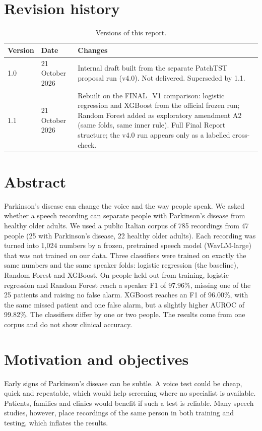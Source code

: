\documentclass[11pt,a4paper]{article}
\begin{document}
\section*{Revision history}
\begin{table}[H]\centering\small\renewcommand{\arraystretch}{1.15}
\caption{Versions of this report.}
\begin{tabular}{llp{11cm}}
\toprule
\textbf{Version} & \textbf{Date} & \textbf{Changes}\\
\midrule
1.0 & 21 October 2026 & Internal draft built from the separate PatchTST proposal run (v4.0). Not delivered. Superseded by 1.1.\\
1.1 & 21 October 2026 & Rebuilt on the FINAL\_V1 comparison: logistic regression and XGBoost from the official frozen run; Random Forest added as exploratory amendment A2 (same folds, same inner rule). Full Final Report structure; the v4.0 run appears only as a labelled cross-check.\\
\bottomrule
\end{tabular}\end{table}
\section{Abstract}\label{sec:abstract}
Parkinson's disease can change the voice and the way people speak. We asked whether a speech recording can separate people with Parkinson's disease from healthy older adults. We used a public Italian corpus of 785 recordings from 47 people (25 with Parkinson's disease, 22 healthy older adults). Each recording was turned into 1,024 numbers by a frozen, pretrained speech model (WavLM-large) that was not trained on our data. Three classifiers were trained on exactly the same numbers and the same speaker folds: logistic regression (the baseline), Random Forest and XGBoost. On people held out from training, logistic regression and Random Forest reach a speaker F1 of 97.96\%, missing one of the 25 patients and raising no false alarm. XGBoost reaches an F1 of 96.00\%, with the same missed patient and one false alarm, but a slightly higher AUROC of 99.82\%. The classifiers differ by one or two people. The results come from one corpus and do not show clinical accuracy.

\section{Motivation and objectives}\label{sec:motivation}
Early signs of Parkinson's disease can be subtle. A voice test could be cheap, quick and repeatable, which would help screening where no specialist is available. Patients, families and clinics would benefit if such a test is reliable. Many speech studies, however, place recordings of the same person in both training and testing, which inflates the results.
\end{document}
